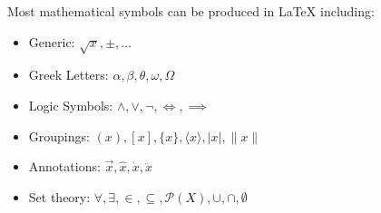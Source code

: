 Most mathematical symbols can be produced in \LaTeX{} including:
\begin{itemize}
\item Generic: $\sqrt{x}, \pm, \dots$
\item Greek Letters: $\alpha, \beta, \theta, \omega, \Omega$
\item Logic Symbols: $\land, \lor, \lnot, \iff, \implies$
\item Groupings: $(x), [x], \{x\}, \langle x \rangle, \lvert x \rvert, \lVert x \rVert$
\item Annotations: $\vec{x}, \hat{x}, \dot{x}, \ddot{x}$
\item Set theory: $\forall, \exists, \in, \subseteq, \mathcal{P}(X), \cup, \cap, \emptyset$
\end{itemize}